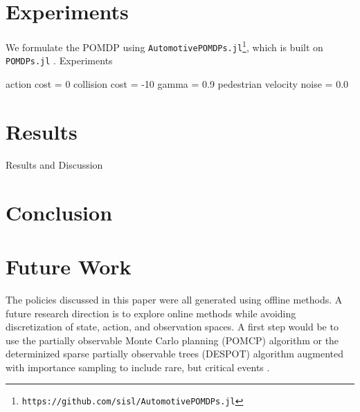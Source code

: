 \documentclass[conference]{IEEEtran}
\begin{document}

\section{Experiments}
\label{sec:experiments}
We formulate the POMDP using \texttt{AutomotivePOMDPs.jl}\footnote{\texttt{https://github.com/sisl/AutomotivePOMDPs.jl}}, which is built on \texttt{POMDPs.jl} \cite{Egorov2017POMDPs.jl:Uncertainty}.
Experiments

action cost = 0
collision cost = -10
gamma = 0.9
pedestrian velocity noise = 0.0

\begin{figure}[htbp]
    
    \caption{}
    \label{fig:qmdp}
\end{figure}

\section{Results}
\label{sec:results}


Results and Discussion

\section{Conclusion}
\label{sec:conclusion}


\section{Future Work}
\label{sec:future-work}

The policies discussed in this paper were all generated using offline methods. A future research direction is to explore online methods while avoiding discretization of state, action, and observation spaces. A first step would be to use the partially observable Monte Carlo planning (POMCP) algorithm \cite{Silver2010Monte-CarloPOMDPs} or the determinized sparse partially observable trees (DESPOT) algorithm augmented with importance sampling to include rare, but critical events \cite{Ye2017DESPOT:Regularization, Luo2019ImportanceUncertainty}. 
\end{document}

